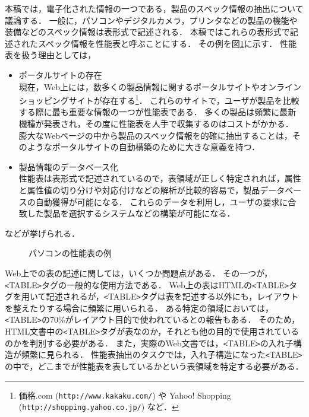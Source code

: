 本稿では，電子化された情報の一つである，製品のスペック情報の抽出について議論する．
一般に，パソコンやデジタルカメラ，プリンタなどの製品の機能や装備などのスペック情報は表形式で記述される．
本稿ではこれらの表形式で記述されたスペック情報を性能表と呼ぶことにする．
その例を図\ref{spec}に示す．
性能表を扱う理由としては，
\begin{itemize}
\item ポータルサイトの存在\\
現在，Web上には，数多くの製品情報に関するポータルサイトやオンラインショッピングサイトが存在する\footnote{価格.com (\verb+http://www.kakaku.com/+) や Yahoo! Shopping (\verb+http://shopping.yahoo.co.jp/+) など．}．
これらのサイトで，ユーザが製品を比較する際に最も重要な情報の一つが性能表である．
多くの製品は頻繁に最新機種が発表され，その度に性能表を人手で収集するのはコストがかかる．
膨大なWebページの中から製品のスペック情報を的確に抽出することは，そのようなポータルサイトの自動構築のために大きな意義を持つ．

\item 製品情報のデータベース化\\
性能表は表形式で記述されているので，表領域が正しく特定されれば，属性と属性値の切り分けや対応付けなどの解析が比較的容易で，製品データベースの自動獲得が可能になる．
これらのデータを利用し，ユーザの要求に合致した製品を選択するシステムなどの構築が可能になる\cite{shimada4}．
\end{itemize}
などが挙げられる．

\begin{figure}
\begin{center}
\end{center}
\caption{パソコンの性能表の例}
\label{spec}
\end{figure}

Web上での表の記述に関しては，いくつか問題点がある．
その一つが，\verb+<+TABLE\verb+>+タグの一般的な使用方法である．
Web上の表はHTMLの\verb+<+TABLE\verb+>+タグを用いて記述されるが，\verb+<+TABLE\verb+>+タグは表を記述する以外にも，レイアウトを整えたりする場合に頻繁に用いられる．
ある特定の領域においては，\verb+<+TABLE\verb+>+の70\%がレイアウト目的で使われているとの報告もある\cite{chen}．
そのため，HTML文書中の\verb+<+TABLE\verb+>+タグが表なのか，それとも他の目的で使用されているのかを判別する必要がある．
また，実際のWeb文書では，\verb+<+TABLE\verb+>+の入れ子構造が頻繁に見られる．
性能表抽出のタスクでは，入れ子構造になった\verb+<+TABLE\verb+>+の中で，どこまでが性能表を表しているかという表領域を特定する必要がある．

